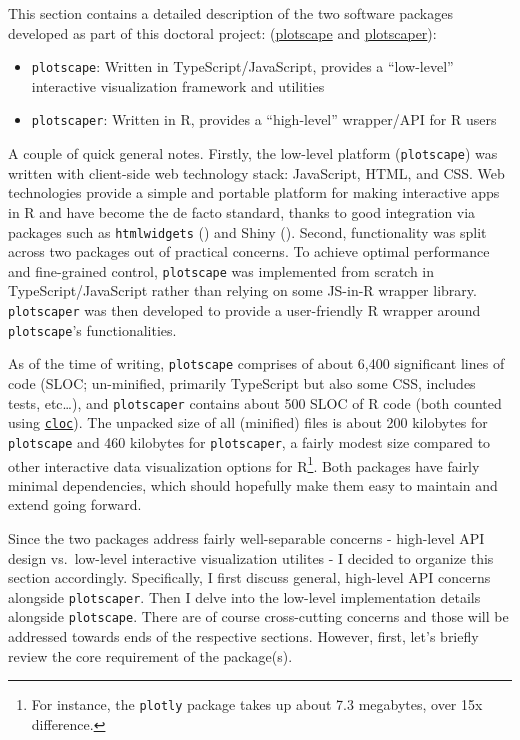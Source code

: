 \documentclass[
  openany]{book}
\providecommand{\tightlist}{%
  \setlength{\itemsep}{0pt}\setlength{\parskip}{0pt}}
\theoremstyle{definition}
\theoremstyle{definition}
\theoremstyle{definition}
\theoremstyle{definition}
\theoremstyle{remark}
\begin{document}
This section contains a detailed description of the two software packages developed as part of this doctoral project: (\href{https://github.com/bartonicek/plotscape}{plotscape} and \href{https://github.com/bartonicek/plotscaper}{plotscaper}):

\begin{itemize}
\tightlist
\item
  \texttt{plotscape}: Written in TypeScript/JavaScript, provides a ``low-level'' interactive visualization framework and utilities
\item
  \texttt{plotscaper}: Written in R, provides a ``high-level'' wrapper/API for R users
\end{itemize}

A couple of quick general notes. Firstly, the low-level platform (\texttt{plotscape}) was written with client-side web technology stack: JavaScript, HTML, and CSS. Web technologies provide a simple and portable platform for making interactive apps in R and have become the de facto standard, thanks to good integration via packages such as \texttt{htmlwidgets} () and Shiny (). Second, functionality was split across two packages out of practical concerns. To achieve optimal performance and fine-grained control, \texttt{plotscape} was implemented from scratch in TypeScript/JavaScript rather than relying on some JS-in-R wrapper library. \texttt{plotscaper} was then developed to provide a user-friendly R wrapper around \texttt{plotscape}'s functionalities.

As of the time of writing, \texttt{plotscape} comprises of about 6,400 significant lines of code (SLOC; un-minified, primarily TypeScript but also some CSS, includes tests, etc\ldots), and \texttt{plotscaper} contains about 500 SLOC of R code (both counted using \href{https://github.com/AlDanial/cloc}{\texttt{cloc}}). The unpacked size of all (minified) files is about 200 kilobytes for \texttt{plotscape} and 460 kilobytes for \texttt{plotscaper}, a fairly modest size compared to other interactive data visualization options for R\footnote{For instance, the \texttt{plotly} package takes up about 7.3 megabytes, over 15x difference.}. Both packages have fairly minimal dependencies, which should hopefully make them easy to maintain and extend going forward.

Since the two packages address fairly well-separable concerns - high-level API design vs.~low-level interactive visualization utilites - I decided to organize this section accordingly. Specifically, I first discuss general, high-level API concerns alongside \texttt{plotscaper}. Then I delve into the low-level implementation details alongside \texttt{plotscape}. There are of course cross-cutting concerns and those will be addressed towards ends of the respective sections. However, first, let's briefly review the core requirement of the package(s).
\end{document}
